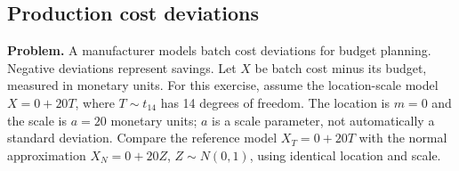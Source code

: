 
\clearpage
\subsection{Production cost deviations}
\label{c9-d2}
\textbf{Problem.} A manufacturer models batch cost deviations for budget planning. Negative deviations represent savings. Let $X$ be batch cost minus its budget, measured in monetary units. For this exercise, assume the location-scale model $X=0+20T$, where $T\sim t_{14}$ has 14 degrees of freedom. The location is $m=0$ and the scale is $a=20$ monetary units; $a$ is a scale parameter, not automatically a standard deviation. Compare the reference model $X_T=0+20T$ with the normal approximation $X_N=0+20Z$, $Z\sim N(0,1)$, using identical location and scale.
